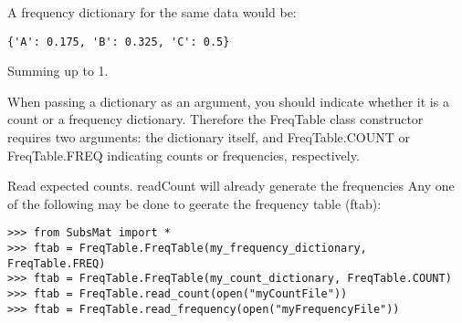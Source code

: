\begin{enumerate}
 A frequency dictionary for the same data would be:

\begin{verbatim}
{'A': 0.175, 'B': 0.325, 'C': 0.5}
\end{verbatim}

Summing up to 1.

When passing a dictionary as an argument, you should indicate whether it is a count or a frequency dictionary. Therefore the FreqTable class constructor requires two arguments: the dictionary itself, and FreqTable.COUNT or FreqTable.FREQ indicating counts or frequencies, respectively.

Read expected counts. readCount will already generate the frequencies
Any one of the following may be done to geerate the frequency table (ftab):

\begin{verbatim}
>>> from SubsMat import *
>>> ftab = FreqTable.FreqTable(my_frequency_dictionary, FreqTable.FREQ)
>>> ftab = FreqTable.FreqTable(my_count_dictionary, FreqTable.COUNT)
>>> ftab = FreqTable.read_count(open("myCountFile"))
>>> ftab = FreqTable.read_frequency(open("myFrequencyFile"))
\end{verbatim}

\end{enumerate}
